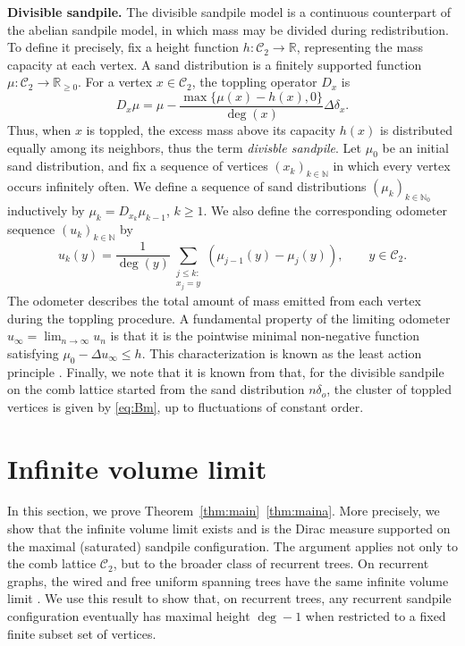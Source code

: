 \documentclass[11pt]{article}
\begin{document}
\textbf{Divisible sandpile.} The divisible sandpile model is a continuous counterpart of the abelian sandpile model, in which mass may be divided during redistribution. To define it precisely, fix a height function $h:\mathcal{C}_2\to\mathbb{R}$, representing the mass capacity at each vertex. A sand distribution is a finitely supported function $\mu:\mathcal{C}_2\to\mathbb{R}_{\geq 0}$. For a vertex $x\in\mathcal{C}_2$, the toppling operator $D_x$ is 
\[
D_x\mu=\mu-\frac{\max\{\mu(x)-h(x),0\}}{\deg(x)}\Delta\delta_x .
\]
Thus, when $x$ is toppled, the excess mass above its capacity $h(x)$ is distributed equally among its neighbors, thus the term \emph{divisble sandpile}.
Let $\mu_0$ be an initial sand distribution, and fix a sequence of vertices $(x_k)_{k\in\mathbb{N}}$ in which every vertex occurs infinitely often. We define a sequence of sand distributions $(\mu_k)_{k\in\mathbb{N}_0}$ inductively by
$\mu_k=D_{x_k}\mu_{k-1}$, $k\geq 1$. We also define the corresponding odometer sequence $(u_k)_{k\in\mathbb{N}}$ by
\[
u_k(y)=\frac{1}{{\deg(y)}}\sum_{\substack{j\leq k:\\ x_j=y}}(\mu_{j-1}(y)-\mu_{j}(y)),
\qquad y\in\mathcal{C}_2 .
\]
The odometer describes the total amount of mass emitted from each vertex during the toppling procedure. A fundamental property of the limiting odometer $u_\infty=\lim_{n\to\infty}u_n$ is that it is the pointwise minimal non-negative function satisfying
$\mu_0-\Delta u_\infty\leq h $.
This characterization is known as the least action principle \cite{Rotor-Zd-Levine-Peres-2008}.
Finally, we note that it is known from \cite{IDLA-comb-2012} that, for the divisible sandpile on the comb lattice started from the sand distribution $n\delta_o$, the cluster of toppled vertices is given by \eqref{eq:Bm}, up to fluctuations of constant order.

\section{Infinite volume limit}\label{sec:inf-vol}

In this section, we prove Theorem~\ref{thm:main}~\ref{thm:maina}. More precisely, we show that the infinite volume limit exists and is the Dirac measure supported on the maximal (saturated) sandpile configuration. The argument applies not only to the comb lattice $\mathcal{C}_2$, but to the broader class of recurrent trees. On recurrent graphs, the wired and free uniform spanning trees have the same infinite volume limit \cite[Proposition~5.6]{BLPS01}. We use this result to show that, on recurrent trees, any recurrent sandpile configuration eventually has maximal height $\deg-1$ when restricted to a fixed finite subset set of vertices.
\end{document}
